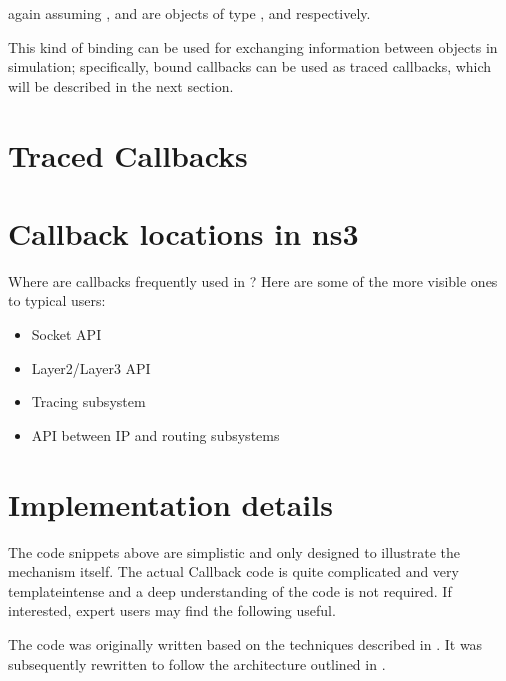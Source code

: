 \documentclass[letterpaper,10pt,english]{sphinxmanual}
\begin{document}
again assuming ,  and  are objects of type ,  and  respectively.

This kind of binding can be used for exchanging information between objects in
simulation; specifically, bound callbacks can be used as traced callbacks, which will
be described in the next section.


\section{Traced Callbacks}
\label{\detokenize{callbacks:traced-callbacks}}


\section{Callback locations in ns\sphinxhyphen{}3}
\label{\detokenize{callbacks:callback-locations-in-ns-3}}
Where are callbacks frequently used in ?  Here are some of the
more visible ones to typical users:
\begin{itemize}
\item {} 
Socket API

\item {} 
Layer\sphinxhyphen{}2/Layer\sphinxhyphen{}3 API

\item {} 
Tracing subsystem

\item {} 
API between IP and routing subsystems

\end{itemize}


\section{Implementation details}
\label{\detokenize{callbacks:implementation-details}}
The code snippets above are simplistic and only designed to illustrate the mechanism
itself.  The actual Callback code is quite complicated and very template\sphinxhyphen{}intense and
a deep understanding of the code is not required.  If interested, expert users may
find the following useful.

The code was originally written based on the techniques described in
.
It was subsequently rewritten to follow the architecture outlined in
.
\end{document}
